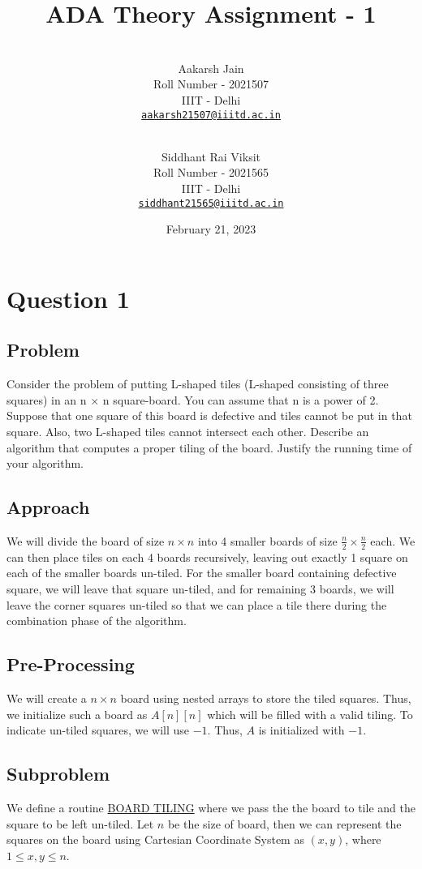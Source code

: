 \documentclass{article}
\title{ADA Theory Assignment - 1}
\author{
    \\\vspace{0em} Aakarsh Jain \\\vspace{-0.5em}
    \footnotesize{Roll Number - 2021507}\\\vspace{-0.5em}
    \footnotesize{IIIT - Delhi}\\\vspace{-0.5em}
    \footnotesize{\href{mailto:aakarsh21507@iiitd.ac.in}{\texttt{aakarsh21507@iiitd.ac.in}}}
  \and
    \\\vspace{0em} Siddhant Rai Viksit \\\vspace{-0.5em}
    \footnotesize{Roll Number - 2021565}\\\vspace{-0.5em}
    \footnotesize{IIIT - Delhi}\\\vspace{-0.5em}
    \footnotesize{\href{mailto:siddhant21565@iiitd.ac.in}{\texttt{siddhant21565@iiitd.ac.in}}} 
    \vspace{1em}
}
\date{February 21, 2023}
\begin{document}
\maketitle

\section{Question 1}

\subsection{Problem}

Consider the problem of putting L-shaped tiles (L-shaped consisting of three squares) in an n × n square-board. You can assume that n is a power of 2. Suppose that one square of this board is defective and tiles cannot be put in that square. Also, two L-shaped tiles cannot intersect each other. Describe an algorithm that computes a proper tiling of the board. Justify the running time of your algorithm.

\subsection{Approach}

We will divide the board of size $n \times n$ into 4 smaller boards of size $\frac{n}{2} \times \frac{n}{2}$ each. We can then place tiles on each 4 boards recursively, leaving out exactly 1 square on each of the smaller boards un-tiled. For the smaller board containing defective square, we will leave that square un-tiled, and for remaining $3$ boards, we will leave the corner squares un-tiled so that we can place a tile there during the combination phase of the algorithm.

\subsection{Pre-Processing}

We will create a $n \times n$ board using nested arrays to store the tiled squares. Thus, we initialize such a board as $A[n][n]$ which will be filled with a valid tiling. To indicate un-tiled squares, we will use $-1$. Thus, $A$ is initialized with $-1$.

\subsection{Subproblem}

We define a routine \underline{BOARD TILING} where we pass the the board to tile and the square to be left un-tiled. Let $n$ be the size of board, then we can represent the squares on the board using Cartesian Coordinate System as $(x, y)$, where $1 \leq x, y \leq n$.
\end{document}
